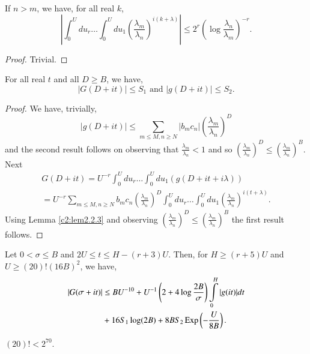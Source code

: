 \begin{sublemma}\label{c2:lem2.2.3}
If $n > m$, we have, for all real $k$, 
$$
|\int^U_0 du_r \ldots \int^U_0 du_1 \left(\frac{\lambda_m}{\lambda_n} \right)^{i(k+\lambda)} | \leq 2^r \left(\log \frac{\lambda_n}{\lambda_m} \right)^{-r}.
$$
\end{sublemma}

\begin{proof}
Trivial.
\end{proof}

\begin{sublemma}\label{c2:lem2.2.4}
For all real $t$ and all $D \geq B$, we have,
$$
|G(D+ it)| \leq S_1 \text{ and } |g(D+ it)| \leq S_2.
$$
\end{sublemma}

\begin{proof}
We have, trivially,
$$ 
|g(D+ it)| \leq \sum\limits_{m \leq M, n \geq N} |b_m c_n| \left( \frac{\lambda_m}{\lambda_n}\right)^D
$$
and the second result follows on observing that $\frac{\lambda_m}{\lambda_n} < 1$ and so $\left( \frac{\lambda_m}{\lambda_n}\right)^D \leq \left(\frac{\lambda_m}{\lambda_n} \right)^B$. Next
\begin{gather*}
G(D+it) = U^{-r} \int^U_0 du_r \ldots \int^U_0 du_1 (g(D+ it + i \lambda))\\
= U^{-r} \sum\limits_{m \leq M, n \geq N} b_m c_n \left( \frac{\lambda_m}{\lambda_n}\right)^D \int^U_0 du_r \ldots \int^U_0 du_1 \left(\frac{\lambda_m}{\lambda_n} \right)^{i(t+\lambda)}.
\end{gather*}
Using Lemma \ref{c2:lem2.2.3} and observing $\left(\frac{\lambda_m}{\lambda_n} \right)^D \leq \left( \frac{\lambda_m}{\lambda_n} \right)^B$ the first result follows. 
\end{proof}

\begin{sublemma}\label{c2:lem2.2.5}
Let $0 < \sigma \leq B $ and $2U \leq t \leq H - (r +3) U$. Then, for $H \geq (r+5)U$ and $U \geq (20)!(16B)^2$, we have,
\begin{align*}
|G(\sigma + it)| & \leq B U^{-10} + U^{-1} \left(2+ 4 \log \frac{2B}{\sigma} \right) \int\limits^H_0 |g(it)| dt\\
& + 16 S_1 \log (2B) + 8 B S_2 \operatorname{Exp} \left( -\frac{U}{8B}\right). 
\end{align*}\pageoriginale
\end{sublemma}

\begin{remark*}
$(20)! < 2^{70}$.
\end{remark*}

